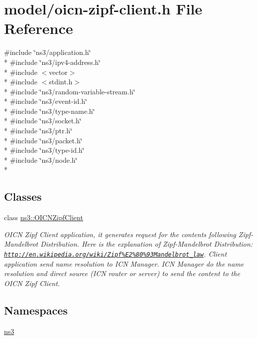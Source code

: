\hypertarget{oicn-zipf-client_8h}{\section{model/oicn-\/zipf-\/client.h File Reference}
\label{oicn-zipf-client_8h}
}
{\ttfamily \#include \char`\"{}ns3/application.\-h\char`\"{}}\\*
{\ttfamily \#include \char`\"{}ns3/ipv4-\/address.\-h\char`\"{}}\\*
{\ttfamily \#include $<$vector$>$}\\*
{\ttfamily \#include $<$stdint.\-h$>$}\\*
{\ttfamily \#include \char`\"{}ns3/random-\/variable-\/stream.\-h\char`\"{}}\\*
{\ttfamily \#include \char`\"{}ns3/event-\/id.\-h\char`\"{}}\\*
{\ttfamily \#include \char`\"{}ns3/type-\/name.\-h\char`\"{}}\\*
{\ttfamily \#include \char`\"{}ns3/socket.\-h\char`\"{}}\\*
{\ttfamily \#include \char`\"{}ns3/ptr.\-h\char`\"{}}\\*
{\ttfamily \#include \char`\"{}ns3/packet.\-h\char`\"{}}\\*
{\ttfamily \#include \char`\"{}ns3/type-\/id.\-h\char`\"{}}\\*
{\ttfamily \#include \char`\"{}ns3/node.\-h\char`\"{}}\\*
\subsection*{Classes}
\begin{DoxyCompactItemize}
\item 
class \hyperlink{classns3_1_1OICNZipfClient}{ns3\-::\-O\-I\-C\-N\-Zipf\-Client}
\begin{DoxyCompactList}\small\item\em O\-I\-C\-N Zipf Client application, it generates request for the contents following Zipf-\/\-Mandelbrot Distribution. Here is the explanation of Zipf-\/\-Mandelbrot Distribution\-: \href{http://en.wikipedia.org/wiki/Zipf%E2%80%93Mandelbrot_law}{\tt http\-://en.\-wikipedia.\-org/wiki/\-Zipf\%\-E2\%80\%93\-Mandelbrot\-\_\-law}. Client application send name resolution to I\-C\-N Manager. I\-C\-N Manager do the name resolution and direct source (I\-C\-N router or server) to send the content to the O\-I\-C\-N Zipf Client. \end{DoxyCompactList}\end{DoxyCompactItemize}
\subsection*{Namespaces}
\begin{DoxyCompactItemize}
\item 
\hyperlink{namespacens3}{ns3}
\end{DoxyCompactItemize}

